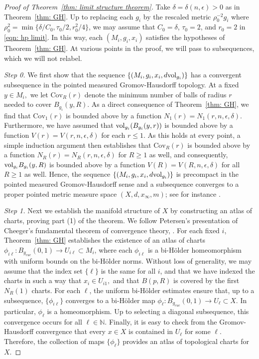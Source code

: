 \documentclass[11pt,reqno]{amsart}
\theoremstyle{remark}
\theoremstyle{definition}
\numberwithin{equation}{section}
\newcommand{\e}{{\epsilon}}
\newcommand{\vol}{{\rm{vol}}}
\begin{document}
\begin{proof}[Proof of Theorem~\ref{thm: limit structure theorem}] Take $\delta=\delta(n, \e)>0$ as in Theorem~\ref{thm: GH}. Up to replacing each $g_i$ by the rescaled metric $\rho_0^{-2} g_i$ where $\rho_0^2 = \min\{\delta/C_0,\tau_0/2, r_0^2/4\}$, we may assume that $C_0=\delta$, $\tau_0=2$, and $r_0 =2$  in \eqref{eqn: hp limit}. In this way, each $(M_i,g_i,x_i)$ satisfies the hypotheses of Theorem~\ref{thm: GH}. At various points in the proof, we will pass to subsequences, which we will not relabel.

{\it Step 0.}  We first show that the sequence $\{(M_i, g_i, x_i, d\vol_{g_i})\}$ has a convergent subsequence in the pointed measured Gromov-Hausdorff topology. At a fixed $y\in M_i,$ we let $\text{Cov}_R(r) $ denote the minimum number of balls of radius $r$ needed to cover $B_{g_i}(y,R)$. As a direct consequence of Theorem~\ref{thm: GH}, we find that $\text{Cov}_1(r)$ is bounded above by a function $N_1(r)=N_1(r,n,\e,\delta)$. Furthermore, we have assumed that $\vol_{g_i}(B_{g_i}(y,r))$ is bounded above by a function $V(r)=V(r,n,\e,\delta)$ for each $r\leq 1$. As this holds at every point, a simple induction argument then establishes that $\text{Cov}_R(r)$ is bounded above by a function $N_R(r)=N_R(r,n,\e,\delta)$ for $R\geq 1$ as well, and consequently, $\vol_{g_i}B_{g_i}(y,R)$ is bounded above by a function $V(R)=V(R,n,\e,\delta)$ for all $R\geq 1$ as well.  Hence, the sequence $\{(M_i,g_i,x_i,d\vol_{g_i})\}$ is precompact in the pointed measured Gromov-Hausdorff sense and a subsequence converges to a proper  pointed metric measure space $(X,d,x_\infty,m)$; see for instance \cite[Theorem 11.4.7]{MMSBOOK}.

{\it Step 1.} Next we establish the manifold structure of $X$ by constructing an atlas of charts, proving part (1) of the theorem. 
 We follow Petersen's presentation of Cheeger's fundamental theorem of convergence theory, \cite[Chapter 10, Theorem 72]{petersenBook}. 
 For each fixed $i$, Theorem~\ref{thm: GH} establishes the existence of an atlas of charts $\phi_{i\ell}:B_{g_{euc}}(0,1)\to U_{i\ell}\subset M_i$, where each $\phi_{i\ell}$ is a bi-H\"{o}lder homeomorphism with uniform bounds on the bi-H\"{o}lder norms. Without loss of generality, we may assume that the index set $\{\ell\}$ is the same for all $i$, and that we have indexed the charts in such a way that $x_i\in U_{i1}, $ and that $B(p,R)$ is covered by the first $N_R(1)$ charts. For each $\ell$, the uniform bi-H\"{o}lder estimates ensure that, up to a subsequence, $\{\phi_{i\ell}\}$ converges to a bi-H\"{o}lder map  $\phi_\ell: B_{g_{euc}}(0,1)\to U_\ell\subset X$. In particular, $\phi_\ell$ is a homeomorphism. Up to selecting a diagonal subsequence, this convergence occurs for all $\ell\in \mathbb{N}.$ Finally, it is easy to check from the Gromov-Hausdorff convergence that every $x\in X$ is contained in $U_\ell$ for some $\ell$. Therefore, the collection of maps $\{\phi_\ell\}$ provides an atlas of topological charts for $X.$


\end{proof}
\end{document}
